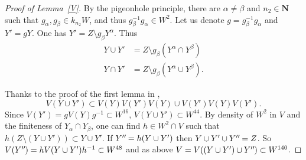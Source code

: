 \documentclass[JEP,XML,SOM,Unicode,NoFloatCountersInSection]{cedram}
\theoremstyle{plain}
\theoremstyle{definition}
\newcommand*{\mydprime}{^{\prime\prime}\mkern-1.2mu}
\newcommand{\NN}{\mathbf{N}}
\begin{document}
\begin{proof}[Proof of Lemma~\ref{V}]
By the pigeonhole principle, there are $\alpha\neq\beta$ and $n_2\in\NN$ such that $g_\alpha,g_\beta\in k_{n_2}W$, and thus $g_\beta^{-1}g_\alpha \in W^2$. Let us denote $g=g_\beta^{-1}g_\alpha$ and $Y'=g Y$. One has $Y'=Z\setminus g_\beta Y^\alpha$. Thus
\begin{align*}
Y\cup Y'&=Z\setminus g_\beta(Y^\alpha\cap Y^\beta)
\\
\tag*{and} Y\cap Y'&=Z\setminus g_\beta(Y^\alpha\cup Y^\beta).
\end{align*}

Thanks to the proof of the first lemma in \cite{MR859950},
\[
V(Y\cup Y')\subset V(Y)V(Y')V(Y)\cup V(Y')V(Y)V(Y').
\]
Since $V(Y')=gV(Y)g^{-1}\subset W^{16}$, $V(Y\cup Y')\subset W^{44}$. By density of $W^2$ in $V$ and the finiteness of $Y_\alpha\cap Y_\beta$, one can find $h\in W^2\cap V$ such that $h(Z\setminus(Y\cup Y'))\subset Y\cup Y'$. If $Y\mydprime=h(Y\cup Y')$ then $Y\cup Y'\cup Y\mydprime=Z$. So $V(Y\mydprime)=hV(Y\cup Y')h^{-1}\subset W^{48}$ and as above $V=V((Y\cup Y')\cup Y\mydprime)\subset W^{140}$.
\end{proof}
\end{document}
